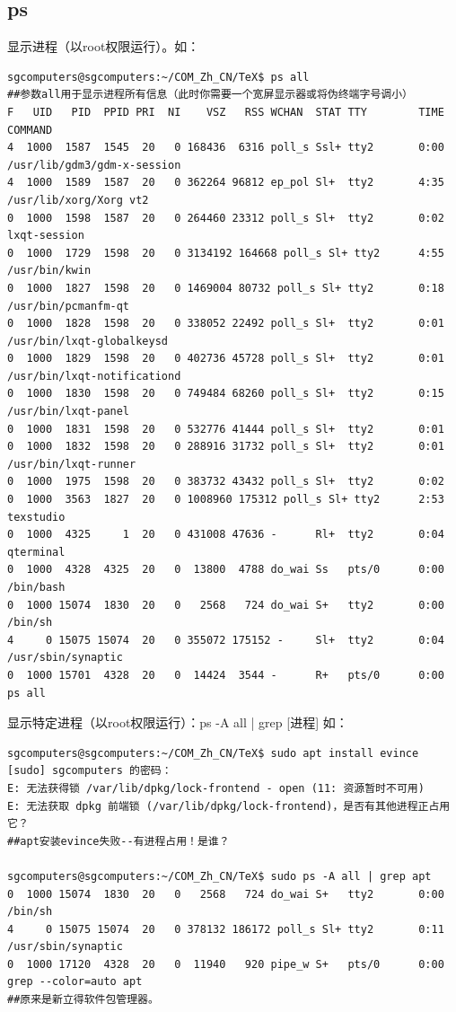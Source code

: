 \documentclass{book}
\begin{document}
\subsection{ps}
显示进程（以root权限运行）。如：
\begin{verbatim}
sgcomputers@sgcomputers:~/COM_Zh_CN/TeX$ ps all
##参数all用于显示进程所有信息（此时你需要一个宽屏显示器或将伪终端字号调小）
F   UID   PID  PPID PRI  NI    VSZ   RSS WCHAN  STAT TTY        TIME COMMAND
4  1000  1587  1545  20   0 168436  6316 poll_s Ssl+ tty2       0:00 /usr/lib/gdm3/gdm-x-session 
4  1000  1589  1587  20   0 362264 96812 ep_pol Sl+  tty2       4:35 /usr/lib/xorg/Xorg vt2 
0  1000  1598  1587  20   0 264460 23312 poll_s Sl+  tty2       0:02 lxqt-session
0  1000  1729  1598  20   0 3134192 164668 poll_s Sl+ tty2      4:55 /usr/bin/kwin
0  1000  1827  1598  20   0 1469004 80732 poll_s Sl+ tty2       0:18 /usr/bin/pcmanfm-qt 
0  1000  1828  1598  20   0 338052 22492 poll_s Sl+  tty2       0:01 /usr/bin/lxqt-globalkeysd
0  1000  1829  1598  20   0 402736 45728 poll_s Sl+  tty2       0:01 /usr/bin/lxqt-notificationd
0  1000  1830  1598  20   0 749484 68260 poll_s Sl+  tty2       0:15 /usr/bin/lxqt-panel
0  1000  1831  1598  20   0 532776 41444 poll_s Sl+  tty2       0:01 
0  1000  1832  1598  20   0 288916 31732 poll_s Sl+  tty2       0:01 /usr/bin/lxqt-runner
0  1000  1975  1598  20   0 383732 43432 poll_s Sl+  tty2       0:02 
0  1000  3563  1827  20   0 1008960 175312 poll_s Sl+ tty2      2:53 texstudio
0  1000  4325     1  20   0 431008 47636 -      Rl+  tty2       0:04 qterminal
0  1000  4328  4325  20   0  13800  4788 do_wai Ss   pts/0      0:00 /bin/bash
0  1000 15074  1830  20   0   2568   724 do_wai S+   tty2       0:00 /bin/sh 
4     0 15075 15074  20   0 355072 175152 -     Sl+  tty2       0:04 /usr/sbin/synaptic
0  1000 15701  4328  20   0  14424  3544 -      R+   pts/0      0:00 ps all
\end{verbatim}
显示特定进程（以root权限运行）：ps -A  all | grep [进程]
如：
\begin{verbatim}
sgcomputers@sgcomputers:~/COM_Zh_CN/TeX$ sudo apt install evince
[sudo] sgcomputers 的密码： 
E: 无法获得锁 /var/lib/dpkg/lock-frontend - open (11: 资源暂时不可用)
E: 无法获取 dpkg 前端锁 (/var/lib/dpkg/lock-frontend)，是否有其他进程正占用它？
##apt安装evince失败--有进程占用！是谁？

sgcomputers@sgcomputers:~/COM_Zh_CN/TeX$ sudo ps -A all | grep apt
0  1000 15074  1830  20   0   2568   724 do_wai S+   tty2       0:00 /bin/sh 
4     0 15075 15074  20   0 378132 186172 poll_s Sl+ tty2       0:11 /usr/sbin/synaptic
0  1000 17120  4328  20   0  11940   920 pipe_w S+   pts/0      0:00 grep --color=auto apt
##原来是新立得软件包管理器。
\end{verbatim}
\end{document}
